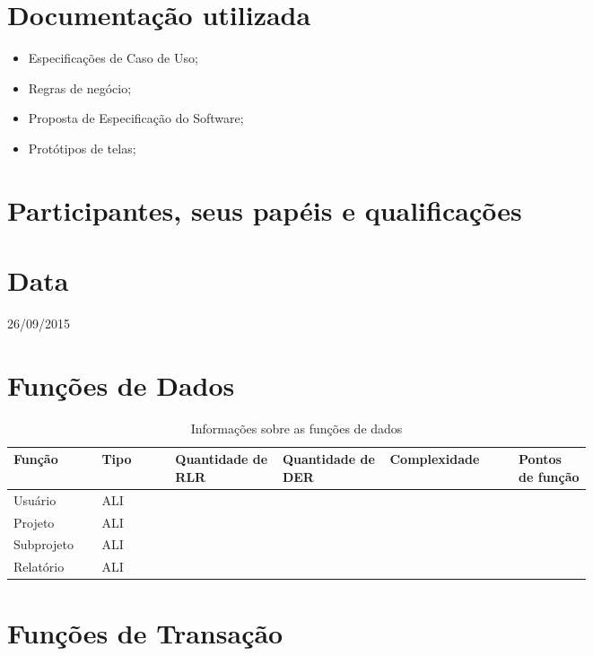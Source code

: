 \section{Documentação utilizada}

\begin{itemize}
 \item Especificações de Caso de Uso;
 \item Regras de negócio;
 \item Proposta de Especificação do Software;
 \item Protótipos de telas;
\end{itemize}

\section{Participantes, seus papéis e qualificações}

\section{Data}
26/09/2015

\section{Funções de Dados}

\begin{table*}[!h]
\centering
\caption{Informações sobre as funções de dados}
\label{Rotulo}
  \begin{tabular}{|p{0.10\linewidth}|p{0.10\linewidth}|p{0.14\linewidth}|p{0.14\linewidth}|p{0.17\linewidth}|p{0.10\linewidth}|}
  \hline
  \textbf{Função} & \textbf{Tipo} & \textbf{Quantidade de RLR} & \textbf{Quantidade de DER} & \textbf{Complexidade} & \textbf{Pontos de função} \\
    \hline
  Usuário & ALI & & &  & \\
  \hline
  Projeto & ALI & & &  & \\
  \hline
  Subprojeto & ALI & &  & & \\
  \hline
  Relatório & ALI & &  & & \\
  \hline
  \end{tabular}
\end{table*}

\vfill
\pagebreak
\section{Funções de Transação}

